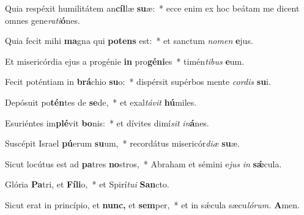 \item Quia respéxit humilitátem an\textbf{cíl}læ \textbf{su}æ:~* ecce enim ex hoc beátam me dicent omnes gene\textit{rati}\textbf{ó}nes.
\item Quia fecit mihi \textbf{ma}gna qui \textbf{pot}\textbf{ens} est:~* et sanctum \textit{nomen} \textbf{e}jus.
\item Et misericórdia ejus a progénie \textbf{in} pro\textbf{gé}\textbf{ni}es~* timén\textit{tibus} \textbf{e}um.
\item Fecit poténtiam in \textbf{brá}chio \textbf{su}o:~* dispérsit supérbos mente \textit{cordis} \textbf{su}i.
\item Depósuit po\textbf{tén}tes de \textbf{se}de,~* et exal\textit{távit} \textbf{hú}miles.
\item Esuriéntes im\textbf{plé}vit \textbf{bo}nis:~* et dívites dimí\myhspace\textit{sit} \textit{in}\textbf{á}nes.
\item Suscépit Israel \textbf{pú}erum \textbf{su}um,~* recordátus misericór\textit{diæ} \textbf{su}æ.
\item Sicut locútus est ad \textbf{pa}tres \textbf{no}stros,~* Abraham et sémini e\tinyhspace\textit{jus} \textit{in} \textbf{sǽ}cula.
\item Glória \textbf{Pa}tri, et \textbf{Fí}\textbf{li}o,~* et Spirí\tinyhspace\textit{tui} \textbf{San}cto.
\item Sicut erat in princípio, et \textbf{nunc,} et \textbf{sem}per,~* et in sǽcula sæcu\tinyhspace\textit{lórum.} \textbf{A}men.

